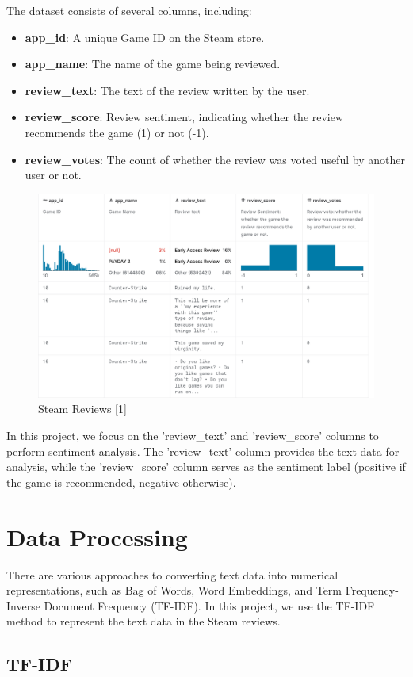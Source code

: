 \documentclass{article}
\begin{document}
The dataset consists of several columns, including:

\begin{itemize}
\item \textbf{app\_id}: A unique Game ID on the Steam store.
\item \textbf{app\_name}: The name of the game being reviewed.
\item \textbf{review\_text}: The text of the review written by the user.
\item \textbf{review\_score}: Review sentiment, indicating whether the review recommends the game (1) or not (-1).
\item \textbf{review\_votes}: The count of whether the review was voted useful by another user or not.
\end{itemize}

\begin{figure}[H]
  \includegraphics[width=12cm]{fig_1.png}
  \centering
  \caption{Steam Reviews [1]}
\end{figure}

In this project, we focus on the 'review\_text' and 'review\_score' columns to perform sentiment analysis. The 'review\_text' column provides the text data for analysis, while the 'review\_score' column serves as the sentiment label (positive if the game is recommended, negative otherwise).


\section{Data Processing}
There are various approaches to converting text data into numerical representations, such as Bag of Words, Word Embeddings, and Term Frequency-Inverse Document Frequency (TF-IDF). In this project, we use the TF-IDF method to represent the text data in the Steam reviews.
\subsection{TF-IDF}
\end{document}
